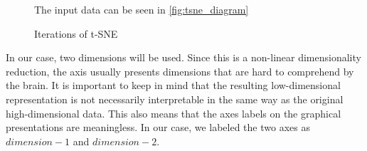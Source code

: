 \begin{figure}[H]
    \centering
    \caption{Iterations of t-SNE}
	\par
    \par\footnotesize{The input data can be seen in \ref{fig:tsne_diagram} }
	\label{fig:tsne_iterations_arrows}
\end{figure}


In our case, two dimensions will be used. Since this is a non-linear dimensionality reduction,
the axis usually presents dimensions that are hard to comprehend by the brain. 
It is important to keep in mind that the resulting low-dimensional representation is not necessarily interpretable in the same way as the original high-dimensional data.
This also means that the axes labels on the graphical presentations are meaningless.
In our case, we labeled the two axes as $dimension-1$ and $dimension-2$.

